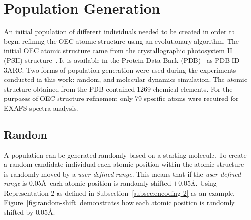 \section{Population Generation}
\label{sec:pop-generation}

An initial population of different individuals needed to be created in order to begin refining the OEC atomic structure using an evolutionary algorithm. The initial OEC atomic structure came from the crystallographic photosystem II (PSII) structure~\cite{umena2011crystal}. It is available in the Protein Data Bank (PDB)~\cite{databank} as PDB ID 3ARC. Two forms of population generation were used during the experiments conducted in this work: random, and molecular dynamics simulation. The atomic structure obtained from the PDB contained 1269 chemical elements. For the purposes of OEC structure refinement only 79 specific atoms were required for EXAFS spectra analysis.


\subsection{Random}
\label{subsec:random-population}

A population can be generated randomly based on a starting molecule. To create a random candidate individual each atomic position within the atomic structure is randomly moved by a \textit{user defined range}. This means that if the \textit{user defined range} is 0.05\AA\ each atomic position is randomly shifted $\pm$0.05\AA. Using Representation 2 as defined in Subsection~\ref{subsec:encoding-2} as an example, Figure~\ref{fig:random-shift} demonstrates how each atomic position is randomly shifted by 0.05\AA.

